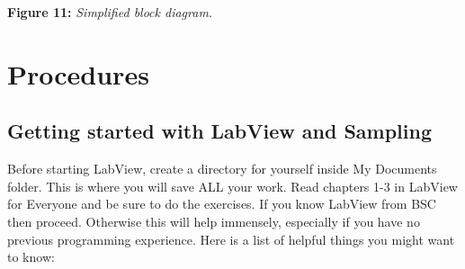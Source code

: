 \documentclass{../lab}
\begin{document}
\textbf{Figure 11:} \emph{Simplified block diagram.}\section{Procedures}

\subsection{Getting started with LabView and Sampling}

Before starting LabView, create a directory for yourself inside My Documents folder. This is where you will save ALL your work. Read chapters 1-3 in LabView for Everyone and be sure to do the exercises. If you know LabView from BSC then proceed. Otherwise this will help immensely, especially if you have no previous programming experience. Here is a list of helpful things you might want to know:
\end{document}
